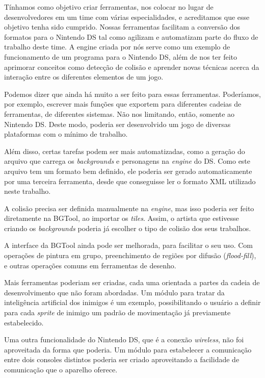 \documentclass[brazil]{abnt}
\begin{document}
Tínhamos como objetivo criar ferramentas, nos colocar no lugar de desenvolvedores em um time com várias especialidades, e acreditamos que esse objetivo tenha sido cumprido. Nossas ferramentas facilitam a conversão dos formatos para o Nintendo DS tal como agilizam e automatizam parte do fluxo de trabalho deste time. A engine criada por nós serve como um exemplo de funcionamento de um programa para o Nintendo DS, além de nos ter feito aprimorar conceitos como detecção de colisão e aprender novas técnicas acerca da interação entre os diferentes elementos de um jogo.

Podemos dizer que ainda há muito a ser feito para essas ferramentas. Poderíamos, por exemplo, escrever mais funções que exportem para diferentes cadeias de ferramentas, de diferentes sistemas. Não nos limitando, então, somente ao Nintendo DS. Deste modo, poderia ser desenvolvido um jogo de diversas plataformas com o mínimo de trabalho.

Além disso, certas tarefas podem ser mais automatizadas, como a geração do arquivo que carrega os \textit{backgrounds} e personagens na \textit{engine} do DS. Como este arquivo tem um formato bem definido, ele poderia ser gerado automaticamente por uma terceira ferramenta, desde que conseguisse ler o formato XML utilizado neste trabalho.


A colisão precisa ser definida manualmente na \textit{engine}, mas isso poderia ser feito diretamente na BGTool, ao importar os \textit{tiles}. Assim, o artista que estivesse criando os \textit{backgrounds} poderia já escolher o tipo de colisão dos seus trabalhos.

A interface da BGTool ainda pode ser melhorada, para facilitar o seu uso. Com operações de pintura em grupo, preenchimento de regiões por difusão (\textit{flood-fill}), e outras operações comuns em ferramentas de desenho.

Mais ferramentas poderiam ser criadas, cada uma orientada a partes da cadeia de desenvolvimento que não foram abordadas. Um módulo para tratar da inteligência artificial dos inimigos é um exemplo, possibilitando o usuário a definir para cada \textit{sprite} de inimigo um padrão de movimentação já previamente estabelecido.

Uma outra funcionalidade do Nintendo DS, que é a conexão \textit{wireless}, não foi aproveitada da forma que poderia. Um módulo para estabelecer a comunicação entre dois consoles distintos poderia ser criado aproveitando a facilidade de comunicação que o aparelho oferece.
\end{document}
